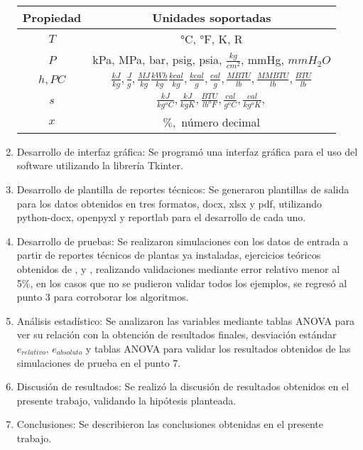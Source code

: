 \begin{enumerate}
\begin{table}[H]
    \begin{tabular}{cc}
        \hline
        Propiedad & Unidades soportadas \\
        \hline
        $T$ & °C, °F, K, R \\
        $P$ & kPa, MPa, bar, psig, psia, $\frac{kg}{cm^{2}}$, mmHg, $mmH_{2}O$ \\
        $h, PC$ & $\frac{kJ}{kg}, \frac{J}{g}, \frac{MJ}{kg}  \frac{kWh}{kg} \frac{kcal}{kg}, \frac{kcal}{g}, \frac{cal}{g}, \frac{MBTU}{lb}, \frac{MMBTU}{lb}, \frac{BTU}{lb} $ \\
        $s$ &  $\frac{kJ}{kg ^{o}C}, \frac{kJ}{kg K}, \frac{BTU}{lb ^{o}F}, \frac{cal}{g ^{o}C}, \frac{cal}{kg ^{o}K}, $ \\
        $x$ & $\%,$ número decimal \\
        \hline
    \end{tabular}
\end{table}
    \item Desarrollo de interfaz gráfica: Se programó una interfaz gráfica para el uso del software utilizando la librería Tkinter.
    \item Desarrollo de plantilla de reportes técnicos: Se generaron plantillas de salida para los datos obtenidos en tres formatos, docx, xlsx y pdf, utilizando python-docx, openpyxl y reportlab para el desarrollo de cada uno.
    \item Desarrollo de pruebas: Se realizaron simulaciones con los datos de entrada a partir de reportes técnicos de plantas ya instaladas, ejercicios teóricos obtenidos de \textcite{ccengel2006termodinamica}, \textcite{burghardt1984ingenieria} y \textcite{rajput2009engineering}, realizando validaciones mediante error relativo menor al 5\%, en los casos que no se pudieron validar todos los ejemplos, se regresó al punto 3 para corroborar los algoritmos.
    \item Análisis estadístico: Se analizaron las variables mediante tablas ANOVA para ver su relación con la obtención de resultados finales, desviación estándar $e_{relativo},\, e_{absoluto}$ y tablas ANOVA para validar los resultados obtenidos de las simulaciones de prueba en el punto 7.
    \item Discusión de resultados: Se realizó la discusión de resultados obtenidos en el presente trabajo, validando la hipótesis planteada.
    \item Conclusiones: Se describieron las conclusiones obtenidas en el presente trabajo.
\end{enumerate}


